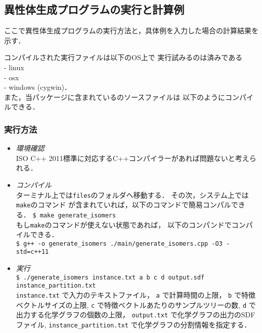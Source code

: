 \documentclass[11pt,titlepage,dvipdfmx,twoside]{jarticle}
\begin{document}
\bigskip




\subsection{異性体生成プログラムの実行と計算例}
\label{sec:Example_m}

ここで異性体生成プログラムの実行方法と，具体例を入力した場合の計算結果を示す．

コンパイルされた実行ファイルは以下のOS上で
実行試みるのは済みである\\
- linux \\
- osx \\
- windows (cygwin)．\\
また，当パッケージに含まれているのソースファイルは
以下のようにコンパイルできる．



\subsubsection{実行方法}
\label{sec:compile_m}
\begin{itemize}
	\item {\em 環境確認}\\
		ISO C++ 2011標準に対応するC++コンパイラーがあれば問題ないと考えられる．
	\item {\em コンパイル}\\
	
	      ターミナル上では{\tt files}のフォルダへ移動する．
	      その次，システム上では{\tt make}のコマンド
	      が含まれていれば，以下のコマンドで簡易コンパルできる．
	      \verb|$ make generate_isomers|\\
	      もし{\tt make}のコマンドが使えない状態であれば，
	      以下のコンパンドでコンパイルできる． \\  
		\verb|$ g++ -o generate_isomers ./main/generate_isomers.cpp -O3 -std=c++11| 
	\item {\em 実行}\\
		\verb|$ ./generate_isomers instance.txt a b c d output.sdf instance_partition.txt|\\
		\verb|instance.txt| で入力のテキストファイル，
		\verb|a| で計算時間の上限，
		\verb|b| で特徴ベクトルサイズの上限,
		\verb|c| で特徴ベクトルあたりのサンプルツリーの数,
		\verb|d| で出力する化学グラフの個数の上限，
		\verb|output.txt| で化学グラフの出力のSDFファイル,
		\verb|instance_partition.txt| で化学グラフの分割情報を指定する．
\end{itemize}
\end{document}
